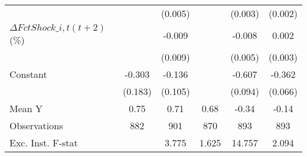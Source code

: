 {\begin{tabular}{l*{5}{c}}
                    &                     &     (0.005)         &                     &     (0.003)         &     (0.002)         \\
\addlinespace
$ \Delta FctShock\_{i,t}(t+2)$ (\%)&                     &      -0.009         &                     &      -0.008         &       0.002         \\
                    &                     &     (0.009)         &                     &     (0.005)         &     (0.003)         \\
\addlinespace
Constant            &      -0.303         &      -0.136         &                     &      -0.607\sym{***}&      -0.362\sym{***}\\
                    &     (0.183)         &     (0.105)         &                     &     (0.094)         &     (0.066)         \\
\midrule
Mean Y              &        0.75         &        0.71         &        0.68         &       -0.34         &       -0.14         \\
Observations        &         882         &         901         &         870         &         893         &         893         \\
Exc. Inst. F-stat   &                     &       3.775         &       1.625         &      14.757         &       2.094         \\
\bottomrule
\end{tabular}
}
